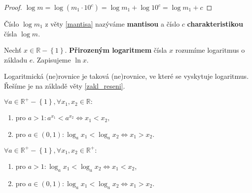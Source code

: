 \begin{proof}
    $\log m = \log \left ( m_1\cdot 10^c \right ) = \log m_1 + \log 10^c
    = \log m_1 + c$
\end{proof}

\begin{definition}
    Číslo $\log m_1$ z věty \ref{mantisa} nazýváme \textbf{mantisou} a číslo
    $c$ \textbf{charakteristikou} čísla $\log m.$
\end{definition}

\begin{definition}
    Nechť $x \in \mathbb R-\left \{ 1 \right \}. $ \textbf{Přirozeným logaritmem} čísla $x$
    rozumíme logaritmus o základu $e$. Zapisujeme $\ln x.$
\end{definition}

\begin{pozn}
    Logaritmická (ne)rovnice je taková (ne)rovnice, ve které se vyskytuje logaritmus.
    Řešíme je na základě věty \ref{zakl_reseni}.
\end{pozn}

\begin{veta}
    $\forall a \in \mathbb R^+ - \left \{ 1 \right \} , \forall x_1, x_2
    \in \mathbb R:$
    \begin{enumerate}[$i.$]
        \item pro $a>1:a^{x_1}<a^{x_2}\iff x_1 < x_2,$
       	\item pro $a \in (0,1): \log_a x_1 < \log_a x_2 \iff x_1 > x_2.$
    \end{enumerate}
\end{veta}

\begin{veta}
    $\forall a \in \mathbb R^+ - \left \{ 1 \right \} , \forall x_1, x_2
    \in \mathbb R^+:$
    \begin{enumerate}[$i.$]
        \item pro $a>1:\log_a x_1 < \log_a x_2 \iff x_1 < x_2$,
       	\item pro $a\in (0,1): \log_a x_1 < \log_a x_2 \iff x_1 > x_2.$
    \end{enumerate}
\end{veta}
